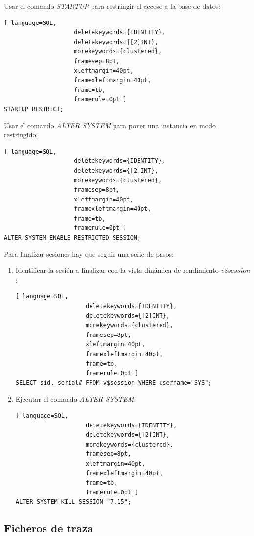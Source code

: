 Usar el comando \textit{STARTUP} para restringir el acceso a la base de datos:
\begin{lstlisting}[ language=SQL,
                    deletekeywords={IDENTITY},
                    deletekeywords={[2]INT},
                    morekeywords={clustered},
                    framesep=8pt,
                    xleftmargin=40pt,
                    framexleftmargin=40pt,
                    frame=tb,
                    framerule=0pt ]
STARTUP RESTRICT;
\end{lstlisting}
Usar el comando \textit{ALTER SYSTEM} para poner una instancia en modo restringido:
\begin{lstlisting}[ language=SQL,
                    deletekeywords={IDENTITY},
                    deletekeywords={[2]INT},
                    morekeywords={clustered},
                    framesep=8pt,
                    xleftmargin=40pt,
                    framexleftmargin=40pt,
                    frame=tb,
                    framerule=0pt ]
ALTER SYSTEM ENABLE RESTRICTED SESSION;
\end{lstlisting}
Para finalizar sesiones hay que seguir una serie de pasos:
\begin{enumerate}
\item Identificar la sesión a finalizar con la vista dinámica de rendimiento $v\$session$:
\begin{lstlisting}[ language=SQL,
                    deletekeywords={IDENTITY},
                    deletekeywords={[2]INT},
                    morekeywords={clustered},
                    framesep=8pt,
                    xleftmargin=40pt,
                    framexleftmargin=40pt,
                    frame=tb,
                    framerule=0pt ]
SELECT sid, serial# FROM v$session WHERE username="SYS";
\end{lstlisting}
\item Ejecutar el comando \textit{ALTER SYSTEM}:
\begin{lstlisting}[ language=SQL,
                    deletekeywords={IDENTITY},
                    deletekeywords={[2]INT},
                    morekeywords={clustered},
                    framesep=8pt,
                    xleftmargin=40pt,
                    framexleftmargin=40pt,
                    frame=tb,
                    framerule=0pt ]
ALTER SYSTEM KILL SESSION "7,15";
\end{lstlisting}
\end{enumerate}

\subsection{Ficheros de traza}

